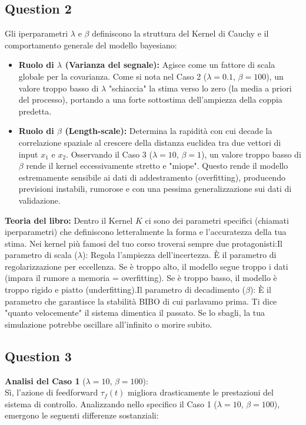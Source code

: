 \documentclass[a4paper,12pt]{article}
\begin{document}
\subsection*{Question 2}
Gli iperparametri $\lambda$ e $\beta$ definiscono la struttura del Kernel di Cauchy e il comportamento generale del modello bayesiano:
\begin{itemize}
    \item \textbf{Ruolo di $\lambda$ (Varianza del segnale):} Agisce come un fattore di scala globale per la covarianza. Come si nota nel Caso 2 ($\lambda = 0.1$, $\beta = 100$), un valore troppo basso di $\lambda$ "schiaccia" la stima verso lo zero (la media a priori del processo), portando a una forte sottostima dell'ampiezza della coppia predetta.
    \item \textbf{Ruolo di $\beta$ (Length-scale):} Determina la rapidità con cui decade la correlazione spaziale al crescere della distanza euclidea tra due vettori di input $x_1$ e $x_2$. Osservando il Caso 3 ($\lambda = 10$, $\beta = 1$), un valore troppo basso di $\beta$ rende il kernel eccessivamente stretto e "miope". Questo rende il modello estremamente sensibile ai dati di addestramento (overfitting), producendo previsioni instabili, rumorose e con una pessima generalizzazione sui dati di validazione.
\end{itemize}
\textbf{Teoria del libro:} Dentro il Kernel $K$ ci sono dei parametri specifici (chiamati iperparametri) che definiscono letteralmente la forma e l'accuratezza della tua stima. Nei kernel più famosi del tuo corso troverai sempre due protagonisti:Il parametro di scala ($\lambda$): Regola l'ampiezza dell'incertezza. È il parametro di regolarizzazione per eccellenza. Se è troppo alto, il modello segue troppo i dati (impara il rumore a memoria = overfitting). Se è troppo basso, il modello è troppo rigido e piatto (underfitting).Il parametro di decadimento ($\beta$): È il parametro che garantisce la stabilità BIBO di cui parlavamo prima. Ti dice "quanto velocemente" il sistema dimentica il passato. Se lo sbagli, la tua simulazione potrebbe oscillare all'infinito o morire subito.

\subsection*{Question 3}
\textbf{Analisi del Caso 1} ($\lambda=10$, $\beta=100$): \\
Sì, l'azione di feedforward $\tau_f(t)$ migliora drasticamente le prestazioni del sistema di controllo. Analizzando nello specifico il Caso 1 ($\lambda=10$, $\beta=100$), emergono le seguenti differenze sostanziali:
\end{document}
